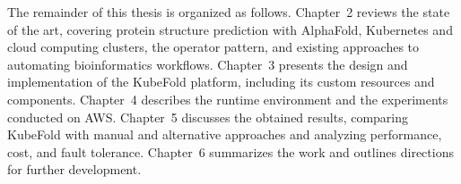 The remainder of this thesis is organized as follows. Chapter~2 reviews the state of the art, covering protein structure prediction with AlphaFold, Kubernetes and cloud computing clusters, the operator pattern, and existing approaches to automating bioinformatics workflows. Chapter~3 presents the design and implementation of the KubeFold platform, including its custom resources and components. Chapter~4 describes the runtime environment and the experiments conducted on AWS. Chapter~5 discusses the obtained results, comparing KubeFold with manual and alternative approaches and analyzing performance, cost, and fault tolerance. Chapter~6 summarizes the work and outlines directions for further development.
